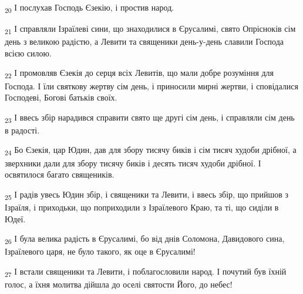 \begin{tcolorbox}
\textsubscript{20} І послухав Господь Єзекію, і простив народ.
\end{tcolorbox}
\begin{tcolorbox}
\textsubscript{21} І справляли Ізраїлеві сини, що знаходилися в Єрусалимі, свято Опрісноків сім день з великою радістю, а Левити та священики день-у-день славили Господа всією силою.
\end{tcolorbox}
\begin{tcolorbox}
\textsubscript{22} І промовляв Єзекія до серця всіх Левитів, що мали добре розуміння для Господа. І їли святкову жертву сім день, і приносили мирні жертви, і сповідалися Господеві, Богові батьків своїх.
\end{tcolorbox}
\begin{tcolorbox}
\textsubscript{23} І ввесь збір нарадився справити свято ще другі сім день, і справляли сім день в радості.
\end{tcolorbox}
\begin{tcolorbox}
\textsubscript{24} Бо Єзекія, цар Юдин, дав для збору тисячу биків і сім тисяч худоби дрібної, а зверхники дали для збору тисячу биків і десять тисяч худоби дрібної. І освятилося багато священиків.
\end{tcolorbox}
\begin{tcolorbox}
\textsubscript{25} І радів увесь Юдин збір, і священики та Левити, і ввесь збір, що прийшов з Ізраїля, і приходьки, що поприходили з Ізраїлевого Краю, та ті, що сиділи в Юдеї.
\end{tcolorbox}
\begin{tcolorbox}
\textsubscript{26} І була велика радість в Єрусалимі, бо від днів Соломона, Давидового сина, Ізраїлевого царя, не було такого, як оце в Єрусалимі!
\end{tcolorbox}
\begin{tcolorbox}
\textsubscript{27} І встали священики та Левити, і поблагословили народ. І почутий був їхній голос, а їхня молитва дійшла до оселі святости Його, до небес!
\end{tcolorbox}
